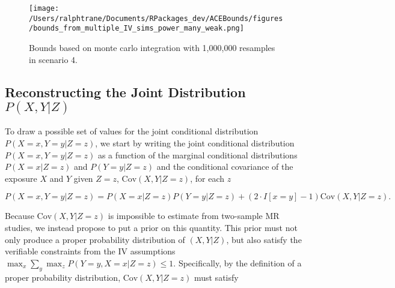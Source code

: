 \documentclass[
]{article}
\theoremstyle{plain}
\begin{document}
\clearpage

\begin{sidewaysfigure}
  \centering
  \texttt{[image: /Users/ralphtrane/Documents/RPackages\_dev/ACEBounds/figures/bounds\_from\_multiple\_IV\_sims\_power\_many\_weak.png]}
  \caption{Bounds based on monte carlo integration with 1,000,000 resamples in scenario 4.}
  \label{fig:bounds_from_multiple_IV_sims_power_many_weak}
\end{sidewaysfigure}

\clearpage

\hypertarget{reconstructing-the-joint-distribution-px-y-z}{%
\subsection{\texorpdfstring{Reconstructing the Joint Distribution \(P(X, Y | Z)\) \label{appendix-quasi-bayesian-details}}{Reconstructing the Joint Distribution P(X, Y \textbar{} Z) }}\label{reconstructing-the-joint-distribution-px-y-z}}

To draw a possible set of values for the joint conditional distribution \(P(X = x, Y = y | Z = z)\), we start by writing the joint conditional distribution \(P(X = x, Y = y | Z = z)\) as a function of the marginal conditional distributions \(P(X = x | Z = z)\) and \(P(Y = y | Z = z)\) and the conditional covariance of the exposure \(X\) and \(Y\) given \(Z=z\), \(\text{Cov}(X, Y | Z = z)\), for each \(z\)

\begin{equation}
P(X = x, Y = y | Z = z) = P(X = x | Z = z)P(Y = y | Z = z) + (2\cdot I[x = y] - 1)\text{Cov}(X, Y | Z = z). \label{eq:cov-expression}
\end{equation}

Because \(\text{Cov}(X, Y | Z = z)\) is impossible to estimate from two-sample MR studies, we instead propose to put a prior on this quantity. This prior must not only produce a proper probability distribution of \((X,Y|Z)\), but also satisfy the verifiable constraints from the IV assumptions \(\max_x \sum_y \max_z P(Y = y, X = x | Z = z) \le 1\). Specifically, by the definition of a proper probability distribution, \(\text{Cov}(X, Y | Z = z)\) must satisfy
\end{document}
